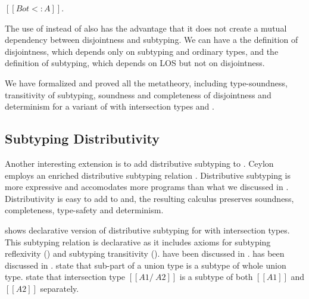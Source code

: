 \begin{lemma}
  $[[Bot <: A]]$.
\label{lemma:discussion:bls}
\end{lemma}

\noindent The use of  instead of  also has the advantage that it does not
create a mutual dependency between disjointness and subtyping. We can have a the definition
of disjointness, which depends only on subtyping and ordinary types, and the definition
of subtyping, which depends on LOS but not on disjointness.

We have formalized and proved all the metatheory, including type-soundness, transitivity of subtyping,
soundness and completeness of disjointness and determinism for a variant of \name with intersection types
and .

\subsection{Subtyping Distributivity}
\label{sec:inter:dist}


Another interesting extension is to add distributive subtyping to \cal.
Ceylon~\cite{} employs an enriched distributive subtyping relation \cite{}.
Distributive subtyping is more expressive and accomodates more programs than what we discussed in
. Distributivity is easy to add to \cal and, the resulting 
calculus preserves soundness, completeness, type-safety and determinism. 


 shows declarative version of distributive subtyping for \cal with intersection types.
This subtyping relation is declarative as it includes axioms for subtyping reflexivity () and
subtyping transitivity ().  have been
discussed in .  has been discussed in .
 state that sub-part of a union type is a subtype of whole union type.
 state that intersection type $[[A1 /\ A2]]$ is a subtype of both $[[A1]]$
and $[[A2]]$ separately.

